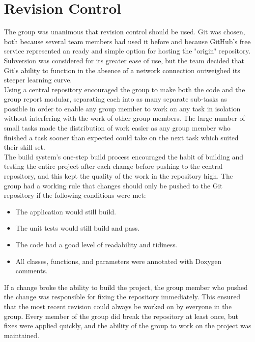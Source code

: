 \section{Revision Control}
\label{Revision Control}

The group was unanimous that revision control should be used. Git was chosen, both because several team members had used it before and because GitHub's free service represented an ready and simple option for hosting the "origin" repository.
Subversion was considered for its greater ease of use, but the team decided that Git's ability to function in the absence of a network connection outweighed its steeper learning curve.\\

Using a central repository encouraged the group to make both the code and the group report modular, separating each into as many separate sub-tasks as possible in order to enable any group member to work on any task in isolation without interfering with the work of other group members.
The large number of small tasks made the distribution of work easier as any group member who finished a task sooner than expected could take on the next task which suited their skill set.\\

The build system's one-step build process encouraged the habit of building and testing the entire project after each change before pushing to the central repository, and this kept the quality of the work in the repository high.
The group had a working rule that changes should only be pushed to the Git repository if the following conditions were met:

\begin{itemize}
  \item The application would still build.
  \item The unit tests would still build and pass.
  \item The code had a good level of readability and tidiness.
  \item All classes, functions, and parameters were annotated with Doxygen comments.
\end{itemize}

If a change broke the ability to build the project, the group member who pushed the change was responsible for fixing the repository immediately.
This ensured that the most recent revision could always be worked on by everyone in the group. Every member of the group did break the repository at least once, but fixes were applied quickly, and the ability of the group to work on the project was maintained.\\

